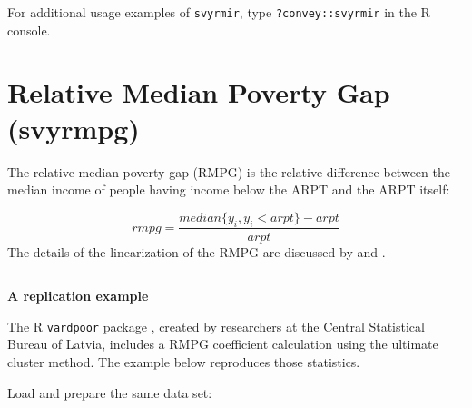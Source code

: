 \documentclass[
]{book}
\begin{document}
For additional usage examples of \texttt{svyrmir}, type \texttt{?convey::svyrmir} in the R console.

\hypertarget{relative-median-poverty-gap-svyrmpg}{%
\section{Relative Median Poverty Gap (svyrmpg)}\label{relative-median-poverty-gap-svyrmpg}}

The relative median poverty gap (RMPG) is the relative difference between the median income of people having income below the ARPT and the ARPT itself:

\[
rmpg = \frac{median\{y_i, y_i<arpt\}-arpt}{arpt}
\]
The details of the linearization of the RMPG are discussed by \textcite{deville1999} and \textcite{osier2009}.

\begin{center}\rule{0.5\linewidth}{0.5pt}\end{center}

\textbf{A replication example}

The R \texttt{vardpoor} package \autocite{vardpoor}, created by researchers at the Central Statistical Bureau of Latvia, includes a RMPG coefficient calculation using the ultimate cluster method. The example below reproduces those statistics.

Load and prepare the same data set:
\end{document}
